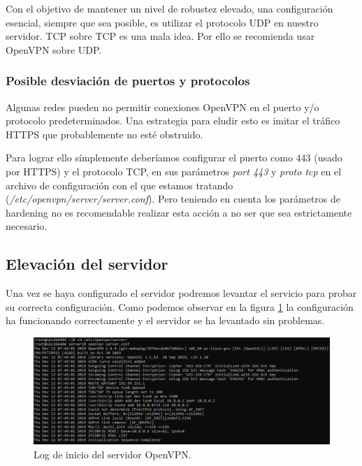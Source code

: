 \documentclass[a4paper, 11pt, titlepage]{article}
\begin{document}
            Con el objetivo de mantener un nivel de robustez elevado, una configuración esencial, siempre que
            sea posible, es utilizar el protocolo UDP en nuestro servidor.
            TCP sobre TCP es una mala idea. %
            Por ello se recomienda usar OpenVPN sobre UDP.
    
        \subsubsection{Posible desviación de puertos y protocolos}
        
            Algunas redes pueden no permitir conexiones OpenVPN en el puerto y/o protocolo predeterminados. 
            Una estrategia para eludir esto es imitar el tráfico HTTPS que probablemente no esté obstruido.
            
            Para lograr ello símplemente deberíamos configurar el puerto como 443 (usado por HTTPS) y 
            el protocolo TCP, en sus parámetros \textit{port 443} y \textit{proto tcp} en el archivo de
            configuración con el que estamos tratando (\textit{/etc/openvpn/server/server.conf}). Pero teniendo
            en cuenta los parámetros de hardening no es recomendable realizar esta acción a no ser que sea
            estrictamente necesario.
            
    \subsection{Elevación del servidor}

        Una vez se haya configurado el servidor podremos levantar el servicio para probar su correcta
        configuración. Como podemos observar en la figura \ref{openvpn08} la configuración ha funcionando
        correctamente y el servidor se ha levantado sin problemas.

        \begin{figure}[htp]
            \centering
            \includegraphics[width=1\textwidth]{resources/openvpn08.png}
            \caption{Log de inicio del servidor OpenVPN.}
            \label{openvpn08}
        \end{figure}   
\end{document}
